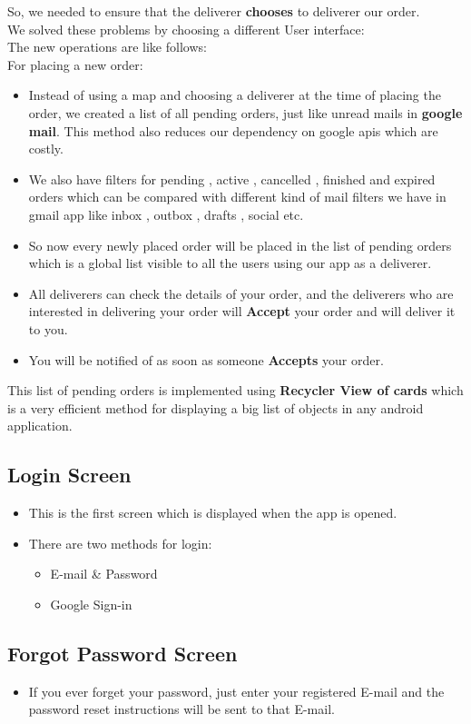 \documentclass{report}
\begin{document}
So, we needed to ensure that the deliverer \textbf{chooses} to deliverer our order.\\
\newline
We solved these problems by choosing a different User interface:\\
The new operations are like follows:\\
For placing a new order:
\begin{itemize}
\item Instead of using a map and choosing a deliverer at the time of placing the order, we created a list of all pending orders, just like unread mails in \textbf{google mail}. This method also reduces our dependency on google apis which are costly.
\item We also have filters for pending , active , cancelled , finished and expired orders which can be compared with different kind of mail filters we have in gmail app like inbox , outbox , drafts , social etc.
\item So now every newly placed order will be placed in the list of pending orders which is a global list visible to all the users using our app as a deliverer.
\item All deliverers can check the details of your order, and the deliverers who are interested in delivering your order will \textbf{Accept} your order and will deliver it to you.
\item You will be notified of  as soon as someone \textbf{Accepts} your order.
\end{itemize}
This list of pending orders is implemented using \textbf{Recycler View of cards} which is a very efficient method for displaying a big list of objects in any android application.

\subsection{Login Screen}
\begin{itemize}
\item This is the first screen which is displayed when the app is opened.
\item There are two methods for login:
\begin{itemize}[label=$\rightarrow$]
\item E-mail \& Password
\item Google Sign-in
\end{itemize}
\end{itemize}

\subsection{Forgot Password Screen}
\begin{itemize}
\item If you ever forget your password, just enter your registered E-mail and the password reset instructions will be sent to that E-mail.
\end{itemize}
\end{document}
